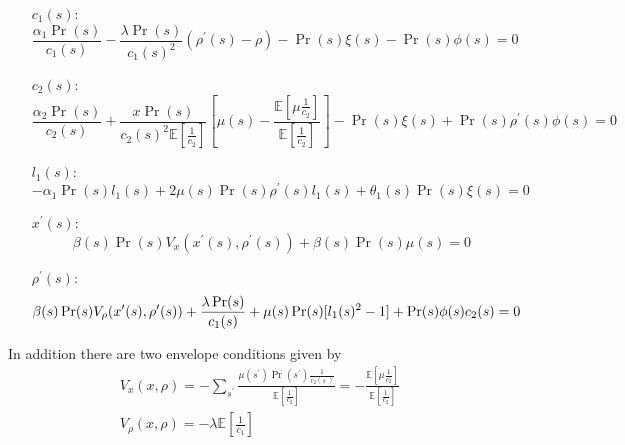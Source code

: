 \documentclass[thmsb,11pt]{article}
\begin{document}
\begin{appendix}
\begin{enumerate}
\item[$c_1(s):$]
\begin{equation}
\frac{\alpha_1\Pr(s)}{c_1(s)}-\frac{\lambda \Pr(s)}{c_1(s)^2}(\rho^{\prime
}(s)-\rho)-\Pr(s)\xi(s)-\Pr(s)\phi(s) = 0  \label{eq.c1FOC}
\end{equation}

\item[$c_2(s):$]
\begin{equation}
\frac{\alpha_2 \Pr(s)}{c_2(s)} + \frac{x\Pr(s)}{c_2(s)^2\mathbb{E}[\frac1{c_2}]}%
\left[\mu(s)-\frac{\mathbb{E}[\mu\frac1{c_2}]}{\mathbb{E}[\frac1{c_2}]}%
\right]-\Pr(s)\xi(s)+\Pr(s)\rho^{\prime }(s)\phi(s)=0  \label{eq.c2FOC}
\end{equation}

\item[$l_1(s):$]
\begin{equation}
-\alpha_1\Pr(s)l_1(s)+2\mu(s)\Pr(s)\rho^{\prime
}(s)l_1(s)+\theta_1(s)\Pr(s)\xi(s)=0
\end{equation}

\item[$x^{\prime }(s):$]
\begin{equation}
\beta(s) \Pr(s)V_x(x^{\prime }(s),\rho^{\prime }(s)) + \beta(s)\Pr(s)\mu(s) = 0
\label{eq.x'FOC}
\end{equation}

\item[$\rho^{\prime }(s):$]
\begin{equation}
\beta(s) \Pr(s) V_{\rho}(x^{\prime }(s),\rho^{\prime }(s))+\frac{\lambda \Pr(s)}{%
c_1(s)}+\mu(s)\Pr(s)[l_1(s)^2-1]+\Pr(s)\phi(s)c_2(s) = 0  \label{eq.FOCNend}
\end{equation}
\end{enumerate}

In addition there are two envelope conditions given by
\begin{align}
V_x(x,\rho) = -\sum_{s^{\prime }}\frac{\mu(s^{\prime })\Pr(s^{\prime
})\frac1{c_2(s^{\prime })}}{\mathbb{E}[\frac1{c_2}]} = -\frac{\mathbb{E}%
[\mu\frac1{c_2}]}{\mathbb{E}[\frac1{c_2}]} \\
V_{\rho}(x,\rho) = -\lambda\mathbb{E}[\frac1{c_1}]  \label{eq.rho_env}
\end{align}


\end{appendix}
\end{document}
